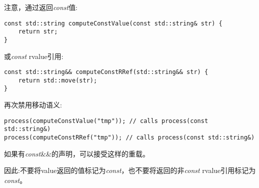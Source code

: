 注意，通过返回\textit{const}值:\par

\begin{lstlisting}[caption={}]
const std::string computeConstValue(const std::string& str) {
	return str;
}
\end{lstlisting}

或\textit{const} rvalue引用:\par

\begin{lstlisting}[caption={}]
const std::string&& computeConstRRef(std::string&& str) {
	return std::move(str);
}
\end{lstlisting}

再次禁用移动语义:\par

\begin{lstlisting}[caption={}]
process(computeConstValue("tmp")); // calls process(const std::string&)
process(computeConstRRef("tmp")); // calls process(const std::string&)
\end{lstlisting}

如果有\textit{const}\&\&的声明，可以接受这样的重载。\par

因此:不要将value返回的值标记为\textit{const}，也不要将返回的非\textit{const} rvalue引用标记为\textit{const}。\par


